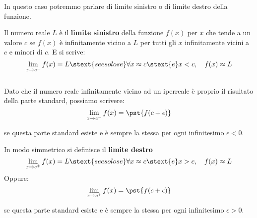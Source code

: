 In questo caso potremmo parlare di limite sinistro o di limite destro della 
funzione.


\begin{definizione}
Il numero reale \(L\) è il \textbf{limite sinistro} della funzione \(f(x)\) 
per \(x\) che tende a un valore \(c\) se \(f(x)\) è infinitamente vicino a 
\(L\) per tutti gli \(x\) infinitamente vicini a \(c\) e minori di 
\(c\). \quad 
E si scrive:
\[\lim_{x \to c^-} f(x) = L \stext{ se e solo se } 
\forall x \approx c \stext{ e } x < c, \quad f(x) \approx L\] \\
Dato che il numero reale infinitamente vicino ad un iperreale è proprio il 
risultato della parte standard, possiamo scrivere:
\[\lim_{x \to c^-} f(x) = \pst{f(c + \epsilon)} \]

\vspace{-1.5em}
\begin{center} 
se questa parte standard esiste e è sempre la stessa 
per ogni infinitesimo \(\epsilon < 0\).
\end{center}
\end{definizione}

\begin{definizione}
In modo simmetrico si definisce il \textbf{limite destro}
\[\lim_{x \to c^+} f(x) = L \stext{ se e solo se } 
\forall x \approx c \stext{ e } x > c, \quad f(x) \approx L\] 
Oppure:
\[\lim_{x \to c^+} f(x) = \pst{f(c + \epsilon)} \]

\vspace{-1.5em}
\begin{center} 
se questa parte standard esiste e è sempre la stessa 
per ogni infinitesimo \(\epsilon > 0\).
\end{center}
\end{definizione}

